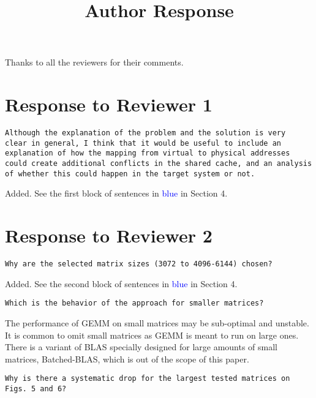 \documentclass[]{article}
\begin{document}
\title{Author Response}
\date{}
\author{}



\maketitle

Thanks to all the reviewers for their comments.

\section{Response to Reviewer 1}

\begin{verbatim}
Although the explanation of the problem and the solution is very
clear in general, I think that it would be useful to include an
explanation of how the mapping from virtual to physical addresses
could create additional conflicts in the shared cache, and an analysis
of whether this could happen in the target system or not.
\end{verbatim}


Added. See the first block of sentences in 
\textcolor{blue}{blue} 
in Section 4.

\section{Response to Reviewer 2}

\begin{verbatim}
Why are the selected matrix sizes (3072 to 4096-6144) chosen?
\end{verbatim}


Added. See the second block of sentences in 
\textcolor{blue}{blue} 
in Section 4.

\begin{verbatim}
Which is the behavior of the approach for smaller matrices?
\end{verbatim}

The performance of GEMM on small matrices may be
sub-optimal
and unstable.
It is common to omit small
matrices as GEMM is meant to run on large ones.
There is a variant of BLAS specially designed for
large amounts of small matrices,
Batched-BLAS, which is out of the scope of this paper.

\begin{verbatim}
Why is there a systematic drop for the largest tested matrices on
Figs. 5 and 6?
\end{verbatim}
\end{document}
